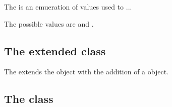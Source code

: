 

The  is an emueration of values used to ...

The possible values are  and .

\subsection{The extended  class}
\label{extended-model-class}




The \SpatialProcessesPackage extends the  object with the
addition of
a \Geometry object.

\subsection{The  class}
\label{geometry-class}




